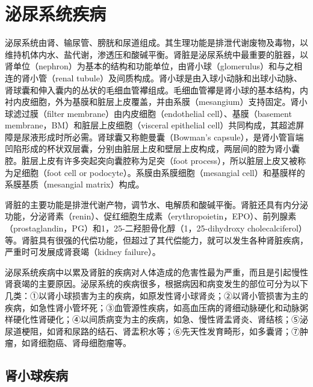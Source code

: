 \chapter{泌尿系统疾病}


泌尿系统由肾、输尿管、膀胱和尿道组成。其生理功能是排泄代谢废物及毒物，以维持机体内水、盐代谢，渗透压和酸碱平衡。肾脏是泌尿系统中最重要的脏器，以肾单位（nephron）为基本的结构和功能单位，由肾小球（glomerulus）和与之相连的肾小管（renal
tubule）及间质构成。肾小球是由入球小动脉和出球小动脉、肾球囊和伸入囊内的丛状的毛细血管襻组成。毛细血管襻是肾小球的基本结构，内衬内皮细胞，外为基膜和脏层上皮覆盖，并由系膜（mesangium）支持固定。肾小球滤过膜（filter
membrane）由内皮细胞（endothelial cell）、基膜（basement
membrane，BM）和脏层上皮细胞（visceral epithelial
cell）共同构成，其超滤屏障是尿液形成时所必需。肾球囊又称鲍曼囊（Bowman's
capsule），是肾小管盲端凹陷形成的杯状双层囊，分别由脏层上皮和壁层上皮构成，两层间的腔为肾小囊腔。脏层上皮有许多突起突向囊腔称为足突（foot
process），所以脏层上皮又被称为足细胞（foot cell or
podocyte）。系膜由系膜细胞（mesangial
cell）和基膜样的系膜基质（mesangial matrix）构成。

肾脏的主要功能是排泄代谢产物，调节水、电解质和酸碱平衡。肾脏还具有内分泌功能，分泌肾素（renin）、促红细胞生成素（erythropoietin，EPO）、前列腺素（prostaglandin，PG）和1，25-二羟胆骨化醇（1，25-dihydroxy
cholecalciferol）等。肾脏具有很强的代偿功能，但超过了其代偿能力，就可以发生各种肾脏疾病，严重时可发展成肾衰竭（kidney
failure）。

泌尿系统疾病中以累及肾脏的疾病对人体造成的危害性最为严重，而且是引起慢性肾衰竭的主要原因。泌尿系统的疾病很多，根据病因和病变发生的部位可分为以下几类：①以肾小球损害为主的疾病，如原发性肾小球肾炎；②以肾小管损害为主的疾病，如急性肾小管坏死；③血管源性疾病，如高血压病的肾细动脉硬化和动脉粥样硬化性肾硬化；④以间质病变为主的疾病，如急、慢性肾盂肾炎、肾结核；⑤泌尿道梗阻，如肾和尿路的结石、肾盂积水等；⑥先天性发育畸形，如多囊肾；⑦肿瘤，如肾细胞癌、肾母细胞瘤等。

\section{肾小球疾病}

